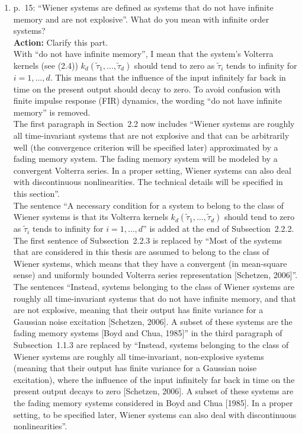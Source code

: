 \documentclass{article}
\newenvironment{answer}{\noindent\ignorespaces\color{blue}}{\noindent\ignorespacesafterend}
\newcommand{\ans}[1]{\begin{answer}#1\end{answer}}
\newcommand{\action}[1]{\textbf{Action:} #1}
\newcommand{\oldnewpage}[2]{\marginpar{{\color{black}#1} / {\color{red}#2}}}
\begin{document}
\begin{enumerate}
	\item \label{item: infinite memory}
		p.~15: ``Wiener systems are defined as systems that do not have infinite memory and are not explosive''. What do you mean with infinite order systems?\\
		\action{Clarify this part.}\\
\ans{With ``do not have infinite memory'', I mean that the system's Volterra kernels (see (2.4)) \mbox{$k_d(\tilde{\tau}_1, \ldots, \tilde{\tau}_d)$} should tend to zero as $\tilde{\tau}_i$ tends to infinity for \mbox{$i=1, \ldots, d$}. This means that the influence of the input infinitely far back in time on the present output should decay to zero. To avoid confusion with finite impulse response (FIR) dynamics, the wording ``do not have infinite memory'' is removed.\\
			\oldnewpage{15}{17}The first paragraph in Section~2.2 now includes ``Wiener systems are roughly all time-invariant systems that are not explosive and that can be arbitrarily well (the convergence criterion will be specified later) approximated by a fading memory system. The fading memory system will be modeled by a convergent Volterra series. In a proper setting, Wiener systems can also deal with discontinuous nonlinearities. The technical details will be specified in this section''.\\
			\oldnewpage{17}{19}The sentence ``A necessary condition for a system to belong to the class of Wiener systems is that its Volterra kernels \mbox{$k_d(\tilde{\tau}_1, \ldots, \tilde{\tau}_d)$} should tend to zero as $\tilde{\tau}_i$ tends to infinity for \mbox{$i=1, \ldots, d$}'' is added at the end of Subsection~2.2.2.\\
			\oldnewpage{17}{19}The first sentence of Subsection~2.2.3 is replaced by ``Most of the systems that are considered in this thesis are assumed to belong to the class of Wiener systems, which means that they have a convergent (in mean-square sense) and uniformly bounded Volterra series representation [Schetzen, 2006]''.\\
			\oldnewpage{5}{5}The sentences ``Instead, systems belonging to the class of Wiener systems are roughly all time-invariant systems that do not have infinite memory, and that are not explosive, meaning that their output has finite variance for a Gaussian noise excitation [Schetzen, 2006]. A subset of these systems are the fading memory systems [Boyd and Chua, 1985]'' in the third paragraph of Subsection~1.1.3 are replaced by ``Instead, systems belonging to the class of Wiener systems are roughly all time-invariant, non-explosive systems (meaning that their output has finite variance for a Gaussian noise excitation), where the influence of the input infinitely far back in time on the present output decays to zero [Schetzen, 2006]. A subset of these systems are the fading memory systems considered in Boyd and Chua [1985]. In a proper setting, to be specified later, Wiener systems can also deal with discontinuous nonlinearities''.}



\end{enumerate}
\end{document}
